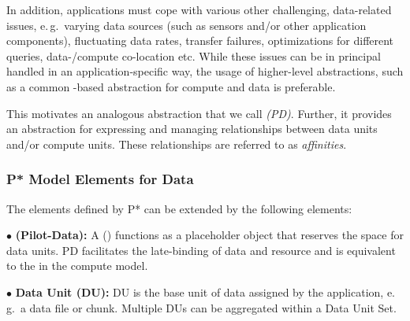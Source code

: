 \documentclass[conference]{IEEEtran}
\begin{document}
In addition, applications must cope with various other challenging,
data-related issues, e.\,g.\ varying data sources (such as sensors
and/or other application components), fluctuating data rates, transfer
failures, optimizations for different queries, data-/compute
co-location etc. While these issues can be in principal handled in an
application-specific way, the usage of higher-level abstractions, such
as a common \pilot-based abstraction for compute and data is
preferable.  


This motivates an analogous abstraction that we call \emph{\pilotdata
  (PD)}.  Further, it provides an abstraction for expressing and
managing relationships between data units and/or compute units. These
relationships are referred to as \emph{affinities}.


\subsubsection*{P* Model Elements for Data}


The elements defined by P* can be extended by the following elements:


\noindent$\bullet$
  \textbf{\pilot (Pilot-Data):} A \pilotdata (\pd) functions as a 
	placeholder object that reserves the space
	for data units. PD facilitates the late-binding of data and resource and is
	equivalent to the \pilot in the compute model.

\noindent$\bullet$
  \textbf{Data Unit (DU):} DU is the base unit of data assigned by
  the application,  e.\,g.\ a data file or chunk. Multiple DUs can be aggregated 
   within a Data Unit Set.


\end{document}

